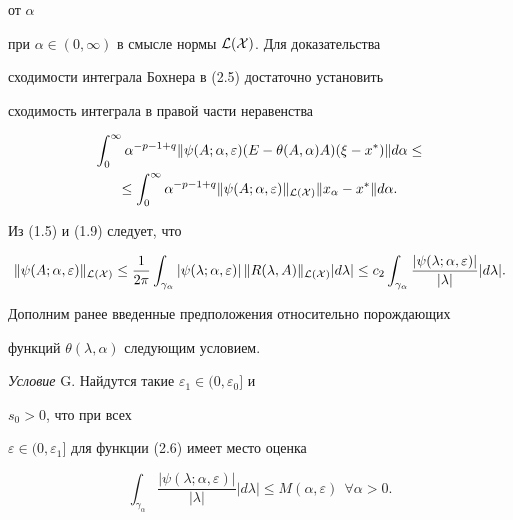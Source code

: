 от $\alpha$


при $\alpha\in(0,\infty)$ в смысле нормы ${\cal L(X)}$. Для доказательства 


сходимости интеграла Бохнера в (2.5) достаточно установить


сходимость интеграла в правой части неравенства


\begin{multline}


\int^\infty_0 \alpha^{-p-1+q}\|\psi(A;\alpha,\varepsilon)


(E-\theta(A,\alpha)A)(\xi-x^*)\|d\alpha\le \\


%


\le\int^\infty_0 \alpha^{-p-1+q}\|\psi(A;\alpha,\varepsilon)


\|_\CL\|x_\alpha-x^*\|d\alpha.


\end{multline}


Из (1.5) и (1.9) следует, что 


\begin{equation}


\|\psi(A;\alpha,\varepsilon)\|_\CL \le\frac{1}{2\pi}


\int_{\gamma_\alpha}|\psi(\lambda;\alpha,\varepsilon)|\,


\|R(\lambda,A)\|_\CL|d\lambda|\le


c_2\int_{\gamma_\alpha}\frac{|\psi(\lambda; \alpha,\varepsilon)|}


{|\lambda|}|d\lambda|.


\end{equation}





Дополним ранее введенные предположения относительно порождающих 


функций $\theta(\lambda,\alpha)$ следующим условием.


\medskip





{\it Условие} G. Найдутся такие $\varepsilon_1\in(0,\varepsilon_0]$ и 


$s_0>0$, что при всех


$\varepsilon\in(0,\varepsilon_1]$ для функции (2.6) имеет место оценка


\begin{equation}


\int_{\gamma_\alpha}\frac{|\psi(\lambda;\alpha,\varepsilon)|}


{|\lambda|}|d\lambda|\le M(\alpha,\varepsilon)\ \ \forall\alpha>0.


\end{equation}


